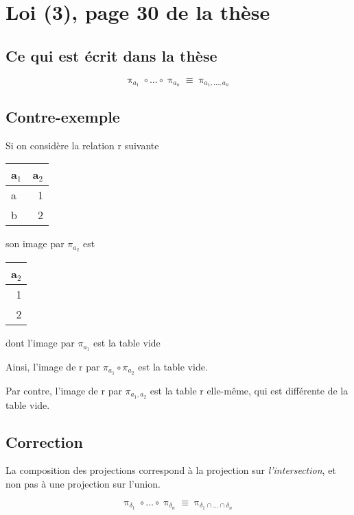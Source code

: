 \documentclass[french]{article}
\DeclareMathOperator{\proj}{\pi}
\begin{document}
\section*{Loi (3), page 30 de la thèse}
\subsection*{Ce qui est écrit dans la thèse}
$$ 
\proj_{a_1} \circ \dots \circ \proj_{a_n} 
\equiv \proj_{a_1, \dots, a_n}
$$

\subsection*{Contre-exemple}
Si on considère la relation r suivante
\begin{center}
	\begin{tabular}{lr}
		a\(_{\text{1}}\) & a\(_{\text{2}}\)\\
		\hline
		a & 1\\
		b & 2\\
	\end{tabular}
\end{center}
son image par \(\pi_{a_2}\) est
\begin{center}
	\begin{tabular}{r}
		a\(_{\text{2}}\)\\
		\hline
		1\\
		2\\
	\end{tabular}
\end{center}
dont l'image par \(\pi_{a_1}\) est la table vide

Ainsi, l'image de r par
\(\pi_{a_1} \circ \pi_{a_2}\) est la table vide.

Par contre, l'image de r par
\(\pi_{a_1, a_2}\)
est la table r elle-même,
qui est différente de la table vide.



\subsection*{Correction}
La composition des projections correspond à la projection sur \emph{l'intersection},
et non pas à une projection sur l'union.

$$
\proj_{\delta_1} \circ \dots \circ \proj_{\delta_n} 
\equiv \proj_{\delta_1 \cap \dots \cap \delta_n}
$$
\end{document}
